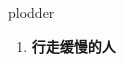 
\begin{frame}
{\huge plodder}
\begin{center}
\begin{enumerate}\Large
  \item \textbf{行走缓慢的人}
\end{enumerate}
\end{center}
\end{frame}
